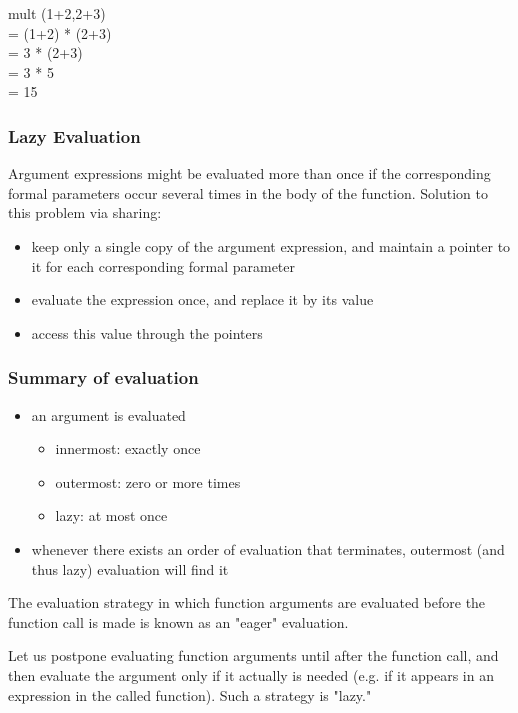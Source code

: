 mult (1+2,2+3)\\
= (1+2) * (2+3)\\
= 3 * (2+3)\\
= 3 * 5\\
= 15

\hypertarget{lazy-evaluation}{%
\subsubsection{Lazy Evaluation}\label{lazy-evaluation}}

Argument expressions might be evaluated more than once if the
corresponding formal parameters occur several times in the body of the
function. Solution to this problem via sharing:

\begin{itemize}
\tightlist
\item
  keep only a single copy of the argument expression, and maintain a
  pointer to it for each corresponding formal parameter
\item
  evaluate the expression once, and replace it by its value
\item
  access this value through the pointers
\end{itemize}

\hypertarget{summary-of-evaluation}{%
\subsubsection{Summary of evaluation}\label{summary-of-evaluation}}

\begin{itemize}
\tightlist
\item
  an argument is evaluated

  \begin{itemize}
  \tightlist
  \item
    innermost: exactly once
  \item
    outermost: zero or more times
  \item
    lazy: at most once
  \end{itemize}
\item
  whenever there exists an order of evaluation that terminates,
  outermost (and thus lazy) evaluation will find it
\end{itemize}

\begin{tcolorbox}[colback=red!5!white,colframe=red!75!black]
The evaluation strategy in which function arguments are evaluated before the function call is made is known as an "eager" evaluation.

Let us postpone evaluating function arguments until after the function call, and then evaluate the argument only if it actually is needed (e.g. if it appears in an expression in the called function). Such a strategy is "lazy."
\end{tcolorbox}

\clearpage